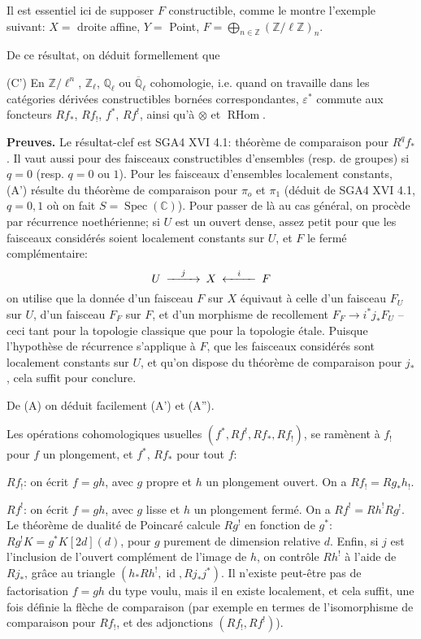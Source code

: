 \documentclass[12pt,a4paper]{article}
\theoremstyle{plain}
\theoremstyle{definition}
\theoremstyle{remark}
\DeclareMathOperator{\Spec}{Spec}
\DeclareMathOperator{\id}{id}
\DeclareMathOperator{\RHom}{RHom}
\newcommand{\CC}{\mathbb{C}}
\newcommand{\QQ}{\mathbb{Q}}
\newcommand{\ZZ}{\mathbb{Z}}
\begin{document}
Il est essentiel ici de supposer $F$ constructible, comme le montre l'exemple suivant: $X =$ droite affine, $Y =$ Point, $F = \bigoplus_{n \in \ZZ} (\ZZ/\ell\ZZ)_n$.

De ce r\'esultat, on d\'eduit formellement que

\medskip
(C') En $\ZZ/\ell^n$, $\ZZ_{\ell}$, $\QQ_{\ell}$ ou $\overline{\QQ}_{\ell}$ cohomologie, i.e. quand on travaille dans les cat\'egories d\'eriv\'ees constructibles born\'ees correspondantes, $\varepsilon^*$ commute aux foncteurs $Rf_*$, $Rf_!$, $f^*$, $Rf^!$, ainsi qu'\`a $\otimes$ et $\RHom$.

\medskip
\noindent\textbf{Preuves.} Le r\'esultat-clef est SGA4 XVI 4.1: th\'eor\`eme de comparaison pour $R^qf_*$. Il vaut aussi pour des faisceaux constructibles d'ensembles (resp. de groupes) si $q = 0$ (resp. $q = 0$ ou $1$). Pour les faisceaux d'ensembles localement constants, (A') r\'esulte du th\'eor\`eme de comparaison pour $\pi_o$ et $\pi_1$ (d\'eduit de SGA4 XVI 4.1, $q = 0, 1$ o\`u on fait $S = \Spec(\CC)$). Pour passer de l\`a au cas g\'en\'eral, on proc\`ede par r\'ecurrence noeth\'erienne; si $U$ est un ouvert dense, assez petit pour que les faisceaux consid\'er\'es soient localement constants sur $U$, et $F$ le ferm\'e compl\'ementaire:
\[
\begin{CD}
U @>{j}>> X @<{i}<< F
\end{CD}
\]
on utilise que la donn\'ee d'un faisceau $F$ sur $X$ \'equivaut \`a celle d'un faisceau $F_U$ sur $U$, d'un faisceau $F_F$ sur $F$, et d'un morphisme de recollement $F_F \to i^*j_*F_U$ -- ceci tant pour la topologie classique que pour la topologie \'etale. Puisque l'hypoth\`ese de r\'ecurrence s'applique \`a $F$, que les faisceaux consid\'er\'es sont localement constants sur $U$, et qu'on dispose du th\'eor\`eme de comparaison pour $j_*$, cela suffit pour conclure.

De (A) on d\'eduit facilement (A') et (A'').

Les op\'erations cohomologiques usuelles $(f^*, Rf^!, Rf_*, Rf_!)$, se ram\`enent \`a $f_!$ pour $f$ un plongement, et $f^*$, $Rf_*$ pour tout $f$:

$Rf_!$: on \'ecrit $f = gh$, avec $g$ propre et $h$ un plongement ouvert. On a $Rf_! = Rg_*h_!$.

$Rf^!$: on \'ecrit $f = gh$, avec $g$ lisse et $h$ un plongement ferm\'e. On a $Rf^! = Rh^!Rg^!$. Le th\'eor\`eme de dualit\'e de Poincar\'e calcule $Rg^!$ en fonction de $g^*$: $Rg^!K = g^*K[2d](d)$, pour $g$ purement de dimension relative $d$. Enfin, si $j$ est l'inclusion de l'ouvert compl\'ement de l'image de $h$, on contr\^ole $Rh^!$ \`a l'aide de $Rj_*$, gr\^ace au triangle $(h_*Rh^!, \id, Rj_*j^*)$. Il n'existe peut-\^etre pas de factorisation $f = gh$ du type voulu, mais il en existe localement, et cela suffit, une fois d\'efinie la fl\`eche de comparaison (par exemple en termes de l'isomorphisme de comparaison pour $Rf_!$, et des adjonctions $(Rf_!, Rf^!)$).
\end{document}
